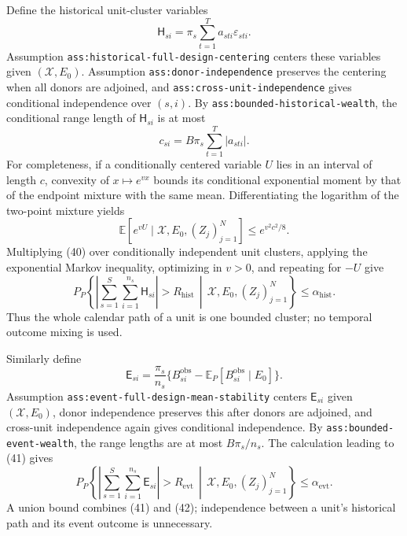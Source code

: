 Define the historical unit-cluster variables
\[
\mathsf H_{si}=\pi_s\sum_{t=1}^{T}a_{sti}\varepsilon_{sti}.
\]
Assumption \texttt{ass:historical-full-design-centering} centers these variables given \((\mathscr X,E_0)\).  Assumption \texttt{ass:donor-independence} preserves the centering when all donors are adjoined, and \texttt{ass:cross-unit-independence} gives conditional independence over \((s,i)\).  By \texttt{ass:bounded-historical-wealth}, the conditional range length of \(\mathsf H_{si}\) is at most
\[
c_{si}=B\pi_s\sum_{t=1}^{T}|a_{sti}|.
\]
For completeness, if a conditionally centered variable \(U\) lies in an interval of length \(c\), convexity of \(x\mapsto e^{vx}\) bounds its conditional exponential moment by that of the endpoint mixture with the same mean.  Differentiating the logarithm of the two-point mixture yields
\[
\mathbb E[e^{vU}\mid\mathscr X,E_0,(Z_j)_{j=1}^{N}]
\leq e^{v^2c^2/8}.
\tag{40}
\]
Multiplying (40) over conditionally independent unit clusters, applying the exponential Markov inequality, optimizing in \(v>0\), and repeating for \(-U\) give
\[
P_P\!\left\{
\left|\sum_{s=1}^{S}\sum_{i=1}^{n_s}\mathsf H_{si}\right|
>R_{\mathrm{hist}}
\,\middle|\,\mathscr X,E_0,(Z_j)_{j=1}^{N}
\right\}
\leq\alpha_{\mathrm{hist}}.
\tag{41}
\]
Thus the whole calendar path of a unit is one bounded cluster; no temporal outcome mixing is used.

Similarly define
\[
\mathsf E_{si}=\frac{\pi_s}{n_s}
\{B_{si}^{\mathrm{obs}}-\mathbb E_P[B_{si}^{\mathrm{obs}}\mid E_0]\}.
\]
Assumption \texttt{ass:event-full-design-mean-stability} centers \(\mathsf E_{si}\) given \((\mathscr X,E_0)\), donor independence preserves this after donors are adjoined, and cross-unit independence again gives conditional independence.  By \texttt{ass:bounded-event-wealth}, the range lengths are at most \(B\pi_s/n_s\).  The calculation leading to (41) gives
\[
P_P\!\left\{
\left|\sum_{s=1}^{S}\sum_{i=1}^{n_s}\mathsf E_{si}\right|
>R_{\mathrm{evt}}
\,\middle|\,\mathscr X,E_0,(Z_j)_{j=1}^{N}
\right\}
\leq\alpha_{\mathrm{evt}}.
\tag{42}
\]
A union bound combines (41) and (42); independence between a unit's historical path and its event outcome is unnecessary.


